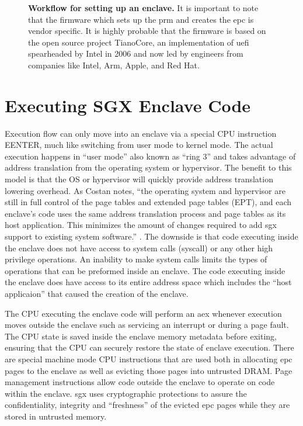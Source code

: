 \begin{figure}[hb]
\centering

\caption[Setting Up Intel SGX]{\textbf{Workflow for setting up an enclave.} It is important to note that the firmware which sets up the \gls{prm} and creates the \gls{epc} is vendor specific. It is highly probable that the firmware is based on the open source project TianoCore, an implementation of \gls{uefi} spearheaded by Intel in 2006 and now led by engineers from companies like Intel, Arm, Apple, and Red Hat.}
\label{fig:sgx-setup}
\end{figure}

\section{Executing SGX Enclave Code}
Execution flow can only move into an enclave via a special CPU instruction EENTER, much like switching from user mode to kernel mode. The actual execution happens in ``user mode'' also known as ``\gls{ring} 3'' and takes advantage of address translation from the operating system or hypervisor. The benefit to this model is that the OS or hypervisor will quickly provide address translation lowering overhead. As Costan notes, ``the operating system and hypervisor are still in full control of the page tables and extended page tables (EPT), and each enclave's code uses the same address translation process and page tables as its host application. This minimizes the amount of changes required to add \gls{sgx} support to existing system software.'' \cite{Costan2016}. The downside is that code executing inside the enclave does not have access to system calls (syscall) or any other high privilege operations. An inability to make system calls limits the types of operations that can be preformed inside an enclave. The code executing inside the enclave does have access to its entire address space which includes the ``host applicaion'' that caused the creation of the enclave.

The CPU executing the enclave code will perform an \gls{aex} whenever execution moves outside the enclave such as servicing an interrupt or during a page fault. The CPU state is saved inside the enclave memory metadata before exiting, ensuring that the CPU can securely restore the state of enclave execution. There are special machine mode CPU instructions that are used both in allocating \gls{epc} pages to the enclave as well as evicting those pages into untrusted DRAM. Page management instructions allow code outside the enclave to operate on code within the enclave. \gls{sgx} uses cryptographic protections to assure the confidentiality, integrity and ``freshness'' \cite{Costan2016} of the evicted \gls{epc} pages while they are stored in untrusted memory. 

